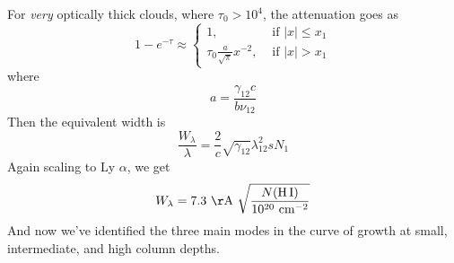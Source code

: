 \documentclass[10pt]{article}
\numberwithin{equation}{section}
\newcommand{\n}{\noindent}
\newcommand{\abs}[1]{\left\vert#1\right\vert}
\begin{document}
\n For \emph{very} optically thick clouds, where $\tau_0 > 10^4$, the
attenuation goes as
\begin{equation}
  \label{eq:ew:20} 1-e^{-\tau} \approx \begin{cases}
    1, &\text{ if }\abs{x}\leq x_1\\
    \tau_0\frac{a}{\sqrt{\pi}}x^{-2}, &\text{ if }\abs{x}> x_1
  \end{cases}
\end{equation}
where
\begin{equation}
  \label{eq:ew:21} a = \frac{\gamma_{12}c}{b \nu_{12}}
\end{equation}
Then the equivalent width is
\begin{equation}
  \label{eq:ew:22} \boxed{\frac{W_\lambda}{\lambda} = \frac{2}{c}
  \sqrt{\gamma_{12}}{\lambda_{12}^2sN_1}}
\end{equation}
Again scaling to Ly $\alpha$, we get
\begin{equation}
  \label{eq:ew:23} W_\lambda = 7.3\ \mathrm{\AA}\
  \sqrt{\frac{N(\mathrm{H\,I})}{10^{20}\ \mathrm{cm^{-2}}}}
\end{equation}
And now we've identified the three main modes in the curve of growth at small,
intermediate, and high column depths.
\end{document}
